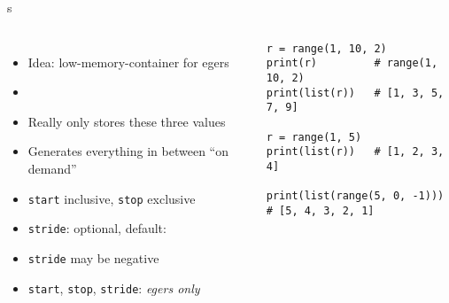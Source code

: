 \begin{frame}[fragile]{s}
%
\begin{columns}[T]
\begin{itemize}
\item Idea: low-memory-container for egers
\item {}
\item Really only stores these three values
\item Generates everything in between \enquote{on demand}
\item \texttt{start} inclusive, \texttt{stop} exclusive
\item \texttt{stride}: optional, default: 
\item \texttt{stride} may be negative
\item \texttt{start}, \texttt{stop}, \texttt{stride}: \emph{egers only}
\end{itemize}
%
\begin{codebox}
\begin{verbatim}
r = range(1, 10, 2)
print(r)         # range(1, 10, 2)
print(list(r))   # [1, 3, 5, 7, 9]

r = range(1, 5)
print(list(r))   # [1, 2, 3, 4]

print(list(range(5, 0, -1)))
# [5, 4, 3, 2, 1]

\end{verbatim}
\end{codebox}
\end{columns}
%
\end{frame}


